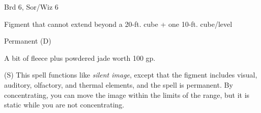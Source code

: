 
\begin{description*}
\item[Level:] Brd 6, Sor/Wiz 6
\item[Effect:] Figment that cannot extend beyond a 20-ft. cube + one 10-ft. cube/level
\item[Duration:] Permanent (D)
\item[Arcane Material Component:] A bit of fleece plus powdered jade worth 100 gp.
\end{description*}

(S)
This spell functions like \textit{silent image}, except that the figment includes
visual, auditory, olfactory, and thermal elements, and the spell is permanent.
By concentrating, you can move the image within the limits of the range, but it
is static while you are not concentrating.